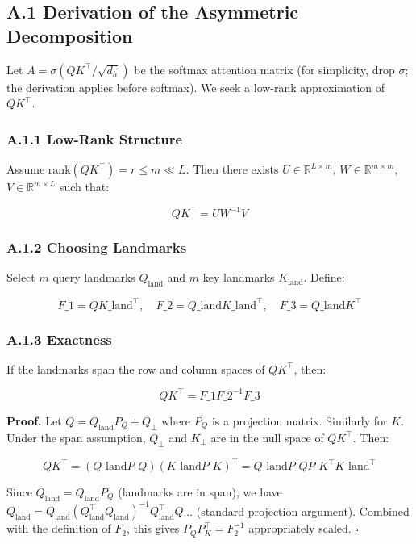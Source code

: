 \subsection{A.1 Derivation of the Asymmetric Decomposition}

Let $A = \sigma(Q K^\top / \sqrt{d_h})$ be the softmax attention matrix (for 
simplicity, drop $\sigma$; the derivation applies before softmax). We seek 
a low-rank approximation of $QK^\top$.

\subsubsection{A.1.1 Low-Rank Structure}

Assume $\text{rank}(QK^\top) = r \le m \ll L$. Then there exists 
$U \in \mathbb{R}^{L \times m}$, $W \in \mathbb{R}^{m \times m}$, 
$V \in \mathbb{R}^{m \times L}$ such that:

\[
QK^\top = U W^{-1} V
\]

\subsubsection{A.1.2 Choosing Landmarks}

Select $m$ query landmarks $Q_\text{land}$ and $m$ key landmarks $K_\text{land}$. 
Define:

\[
F\_1 = Q K\_\text{land}^\top, \quad
F\_2 = Q\_\text{land} K\_\text{land}^\top, \quad
F\_3 = Q\_\text{land} K^\top
\]

\subsubsection{A.1.3 Exactness}

If the landmarks span the row and column spaces of $QK^\top$, then:

\[
Q K^\top = F\_1 F\_2^{-1} F\_3
\]

\textbf{Proof.} Let $Q = Q_\text{land} P_Q + Q_\perp$ where $P_Q$ is a 
projection matrix. Similarly for $K$. Under the span assumption, 
$Q_\perp$ and $K_\perp$ are in the null space of $QK^\top$. Then:

\[
QK^\top = (Q\_\text{land} P\_Q)(K\_\text{land} P\_K)^\top = Q\_\text{land} P\_Q P\_K^\top K\_\text{land}^\top
\]

Since $Q_\text{land} = Q_\text{land} P_Q$ (landmarks are in span), we have 
$Q_\text{land} = Q_\text{land} (Q_\text{land}^\top Q_\text{land})^{-1} Q_\text{land}^\top Q$... 
(standard projection argument). Combined with the definition of $F_2$, this 
gives $P_Q P_K^\top = F_2^{-1}$ appropriately scaled. $\square$

